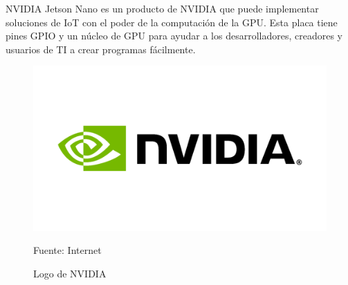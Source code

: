 NVIDIA Jetson Nano es un producto de NVIDIA que puede implementar soluciones de IoT con el poder de la computación de la GPU. Esta placa tiene pines GPIO y un núcleo de GPU para ayudar a los desarrolladores, creadores y usuarios de TI a crear programas fácilmente.

\begin{figure}[H]
  \centering
  \includegraphics[scale = 0.3]{Imagenes/nvidia-logo.png}
  \caption{Logo de NVIDIA}{Fuente: Internet}
\end{figure}